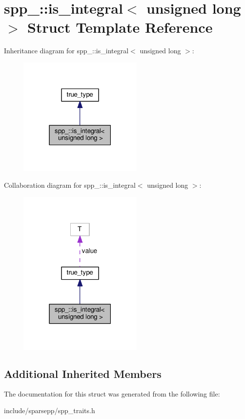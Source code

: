 \hypertarget{structspp___1_1is__integral_3_01unsigned_01long_01_4}{}\section{spp\+\_\+\+:\+:is\+\_\+integral$<$ unsigned long $>$ Struct Template Reference}
\label{structspp___1_1is__integral_3_01unsigned_01long_01_4}


Inheritance diagram for spp\+\_\+\+:\+:is\+\_\+integral$<$ unsigned long $>$\+:\nopagebreak
\begin{figure}[H]
\begin{center}
\leavevmode
\includegraphics[width=174pt]{structspp___1_1is__integral_3_01unsigned_01long_01_4__inherit__graph}
\end{center}
\end{figure}


Collaboration diagram for spp\+\_\+\+:\+:is\+\_\+integral$<$ unsigned long $>$\+:\nopagebreak
\begin{figure}[H]
\begin{center}
\leavevmode
\includegraphics[width=174pt]{structspp___1_1is__integral_3_01unsigned_01long_01_4__coll__graph}
\end{center}
\end{figure}
\subsection*{Additional Inherited Members}


The documentation for this struct was generated from the following file\+:\begin{DoxyCompactItemize}
\item 
include/sparsepp/spp\+\_\+traits.\+h\end{DoxyCompactItemize}
